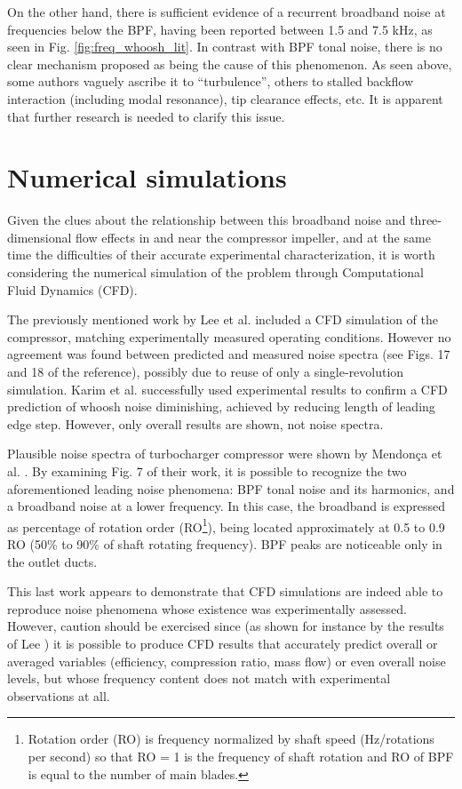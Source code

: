 On the other hand, there is sufficient evidence of a recurrent broadband noise at frequencies below the BPF, having been reported between 1.5 and 7.5 kHz, as seen in Fig. \ref{fig:freq_whoosh_lit}. In contrast with BPF tonal noise, there is no clear mechanism proposed as being the cause of this phenomenon. As seen above, some authors vaguely ascribe it to ``turbulence'', others to stalled backflow interaction (including modal resonance), tip clearance effects, etc. It is apparent that further research is needed to clarify this issue.

\section{Numerical simulations}

Given the clues about the relationship between this broadband noise and three-dimensional flow effects in and near the compressor impeller, and at the same time the difficulties of their accurate experimental characterization, it is worth considering the numerical simulation of the problem through Computational Fluid Dynamics (CFD).

The previously mentioned work by Lee et al. \cite{lee2011control} included a CFD simulation of the compressor, matching experimentally measured operating conditions. However no agreement was found between predicted and measured noise spectra (see Figs. 17 and 18 of the reference), possibly due to reuse of only a single-revolution simulation. Karim et al. \cite{karim2013computational} successfully used experimental results to confirm a CFD prediction of whoosh noise diminishing, achieved by reducing length of leading edge step. However, only overall results are shown, not noise spectra.

Plausible noise spectra of turbocharger compressor were shown by Mendonça et al. \cite{mendonca2012simulation}. By examining Fig. 7 of their work, it is possible to recognize the two aforementioned leading noise phenomena: BPF tonal noise and its harmonics, and a broadband noise at a lower frequency. In this case, the broadband is expressed as percentage of rotation order (RO\footnote{Rotation order (RO) is frequency normalized by shaft speed (Hz/rotations per second) so that RO = 1 is the frequency of shaft rotation and RO of BPF is equal to the number of main blades.}), being located approximately at 0.5 to 0.9 RO (50\% to 90\% of shaft rotating frequency). BPF peaks are noticeable only in the outlet ducts. 

This last work appears to demonstrate that CFD simulations are indeed able to reproduce noise phenomena whose existence was experimentally assessed. However, caution should be exercised since (as shown for instance by the results of Lee \cite{lee2011control}) it is possible to produce CFD results that accurately predict overall or averaged variables (efficiency, compression ratio, mass flow) or even overall noise levels, but whose frequency content does not match with experimental observations at all.

